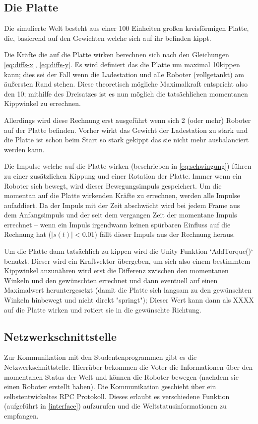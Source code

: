 \subsection{Die Platte}\label{plate}
Die simulierte Welt besteht aus einer 100 Einheiten gro{\ss}en kreisf{\"{o}}rmigen Platte, die, basierend auf den Gewichten welche sich auf ihr befinden kippt.

Die Kr{\"{a}}fte die auf die Platte wirken berechnen sich nach den Gleichungen \ref{eq:diffs-x}, \ref{eq:diffs-y}. Es wird definiert das die Platte um
maximal 10\textdegree kippen kann; dies sei der Fall wenn die Ladestation und alle Roboter (vollgetankt) am {\"{a}}u{\ss}ersten Rand stehen. Diese theoretisch
m{\"{o}}gliche Maximalkraft entspricht also den 10\textdegree; mithilfe des Dreisatzes ist es nun m{\"{o}}glich die tats{\"{a}}chlichen momentanen Kippwinkel
zu errechnen.

Allerdings wird diese Rechnung erst ausgef{\"{u}}hrt wenn sich 2 (oder mehr) Roboter auf der Platte befinden. Vorher wirkt das Gewicht der Ladestation zu
stark und die Platte ist schon beim Start so stark gekippt das sie nicht mehr ausbalanciert werden kann.

Die Impulse welche auf die Platte wirken (beschrieben in \ref{eq:schwingung}) f{\"{u}}hren zu einer zus{\"{a}}tzlichen Kippung und einer Rotation der Platte.
Immer wenn ein Roboter sich bewegt, wird dieser Bewegungsimpuls gespeichert. Um die momentan auf die Platte wirkenden Kr{\"{a}}fte zu errechnen, werden alle
Impulse aufaddiert. Da der Impuls mit der Zeit abschw{\"{a}}cht wird bei jedem Frame aus dem Anfangsimpuls und der seit dem vergangen Zeit der momentane
Impuls errechnet -- wenn ein Impuls irgendwann keinen sp{\"{u}}rbaren Einfluss auf die Rechnung hat ($ |s(t)| < 0.01$) f{\"{a}}llt dieser Impuls aus der
Rechnung heraus.

Um die Platte dann tats{\"{a}}chlich zu kippen wird die Unity Funktion `AddTorque()` benutzt. Dieser wird ein Kraftvektor {\"{u}}bergeben, um sich also einem
bestimmtem Kippwinkel anzun{\"{a}}hren wird erst die Differenz zwischen den momentanen Winkeln und den gew{\"{u}}nschten errechnet und dann eventuell auf
einen Maximalwert heruntergesetzt (damit die Platte sich langsam zu den gew{\"{u}}nschten Winkeln hinbewegt und nicht direkt "springt"); Dieser Wert kann dann
als XXXX auf die Platte wirken und rotiert sie in die gew{\"{u}}nschte Richtung.

\subsection{Netzwerkschnittstelle}
Zur Kommunikation mit den Studentenprogrammen gibt es die Netzwerkschnittstelle. Hierr{\"{u}}ber bekommen die Voter die Informationen {\"{u}}ber den momentanen
Status der Welt und k{\"{o}}nnen die Roboter bewegen (nachdem sie einen Roboter erstellt haben). Die Kommunikation geschieht {\"{u}}ber ein selbstentwickeltes
RPC Protokoll. Dieses erlaubt es verschiedene Funktion (aufgef{\"{u}}hrt in \ref{interface}) aufzurufen und die Weltstatusinformationen zu empfangen.

